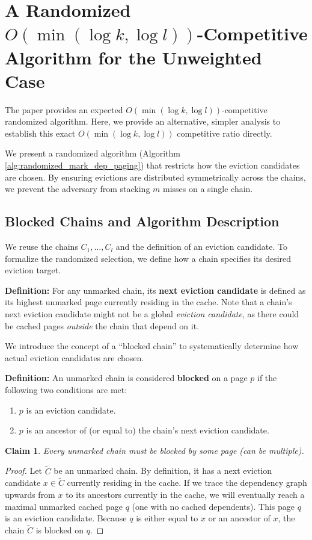 \documentclass[a4paper]{article}
\newtheorem{claim}{Claim}      %
\begin{document}
\section{A Randomized $O(\min(\log k, \log l))$-Competitive Algorithm for the Unweighted Case}
The paper \cite{dallot2024dependency} provides an expected $O(\min(\log k, \log l))$-competitive randomized algorithm. Here, we provide an alternative, simpler analysis to establish this exact $O(\min(\log k, \log l))$ competitive ratio directly.

We present a randomized algorithm (Algorithm \ref{alg:randomized_mark_dep_paging}) that restricts how the eviction candidates are chosen. By ensuring evictions are distributed symmetrically across the chains, we prevent the adversary from stacking $m$ misses on a single chain.

\subsection{Blocked Chains and Algorithm Description}
We reuse the chains $C_1, \ldots, C_l$ and the definition of an eviction candidate. To formalize the randomized selection, we define how a chain specifies its desired eviction target.

\noindent\textbf{Definition:} For any unmarked chain, its \textbf{next eviction candidate} is defined as its highest unmarked page currently residing in the cache. Note that a chain's next eviction candidate might not be a global \textit{eviction candidate}, as there could be cached pages \textit{outside} the chain that depend on it.

We introduce the concept of a ``blocked chain'' to systematically determine how actual eviction candidates are chosen.

\noindent\textbf{Definition:} An unmarked chain is considered \textbf{blocked} on a page $p$ if the following two conditions are met:
\begin{enumerate}
    \item $p$ is an eviction candidate.
    \item $p$ is an ancestor of (or equal to) the chain's next eviction candidate.
\end{enumerate}

\begin{claim}
\label{claim:blocked_unmarked}
Every unmarked chain must be blocked by some page (can be multiple).
\end{claim}
\begin{proof}
Let $\tilde{C}$ be an unmarked chain. By definition, it has a next eviction candidate $x \in \tilde{C}$ currently residing in the cache. If we trace the dependency graph upwards from $x$ to its ancestors currently in the cache, we will eventually reach a maximal unmarked cached page $q$ (one with no cached dependents). This page $q$ is an eviction candidate. Because $q$ is either equal to $x$ or an ancestor of $x$, the chain $\tilde{C}$ is blocked on $q$.
\end{proof}
\end{document}
